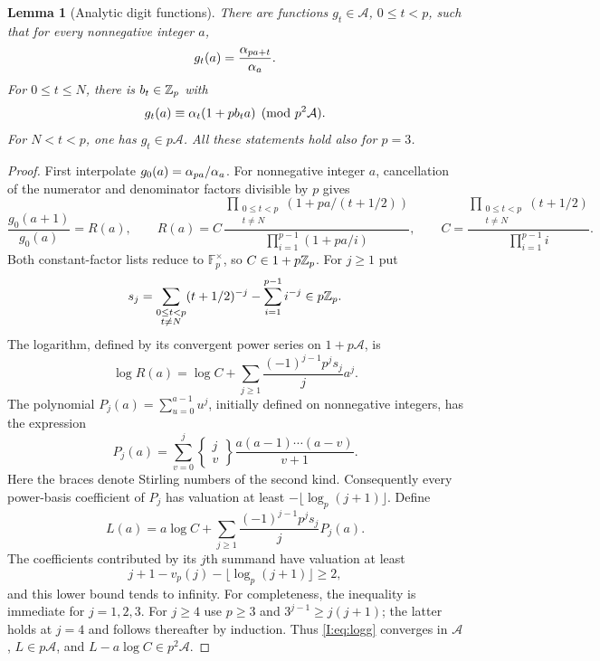 \documentclass[11pt,letterpaper]{article}
\newtheorem{lemma}[theorem]{Lemma}
\theoremstyle{definition}
\theoremstyle{remark}
\begin{document}
\begin{lemma}[Analytic digit functions]\label{I:lem:analyticdigits}
There are functions $g_t\in\mathcal A$, $0\le t<p$, such that for
every nonnegative integer $a$,
\begin{equation}\label{I:eq:exactdigits}
 g_t(a)=\frac{\alpha_{pa+t}}{\alpha_a}.
\end{equation}
For $0\le t\le N$, there is $b_t\in\mathbb Z_p$ with
\begin{equation}\label{I:eq:affinegt}
 g_t(a)\equiv\alpha_t(1+pb_ta)\pmod{p^2\mathcal A}.
\end{equation}
For $N<t<p$, one has $g_t\in p\mathcal A$.
All these statements hold also for $p=3$.
\end{lemma}
\begin{proof}
First interpolate $g_0(a)=\alpha_{pa}/\alpha_a$.
For nonnegative integer $a$, cancellation of the numerator and
denominator factors divisible by $p$ gives
\[
 \frac{g_0(a+1)}{g_0(a)}=R(a),\qquad
 R(a)=C\,
 \frac{\displaystyle\prod_{\substack{0\le t<p\\t\ne N}}
                 (1+pa/(t+1/2))}
      {\displaystyle\prod_{i=1}^{p-1}(1+pa/i)},
 \qquad
 C=\frac{\displaystyle\prod_{\substack{0\le t<p\\t\ne N}}(t+1/2)}
          {\displaystyle\prod_{i=1}^{p-1}i}.
\]
Both constant-factor lists reduce to $\mathbb F_p^\times$, so
$C\in1+p\mathbb Z_p$.  For $j\ge1$ put
\[
 s_j=\sum_{\substack{0\le t<p\\t\ne N}}(t+1/2)^{-j}
                  -\sum_{i=1}^{p-1}i^{-j}\in p\mathbb Z_p.
\]
The logarithm, defined by its convergent power series on $1+p\mathcal A$,
is
\begin{equation}\label{I:eq:logR}
 \log R(a)=\log C+
       \sum_{j\ge1}\frac{(-1)^{j-1}p^js_j}{j}a^j.
\end{equation}
The polynomial $P_j(a)=\sum_{u=0}^{a-1}u^j$, initially defined on
nonnegative integers, has the expression
\[
 P_j(a)=\sum_{v=0}^j
 \left\{\begin{matrix}j\\v\end{matrix}\right\}
 \frac{a(a-1)\cdots(a-v)}{v+1}.
\]
Here the braces denote Stirling numbers of the second kind.  Consequently
every power-basis coefficient of $P_j$ has valuation at least
$-\lfloor\log_p(j+1)\rfloor$.
Define
\begin{equation}\label{I:eq:logg}
 L(a)=a\log C+
       \sum_{j\ge1}\frac{(-1)^{j-1}p^js_j}{j}P_j(a).
\end{equation}
The coefficients contributed by its $j$th summand have valuation at
least
\begin{equation}\label{I:eq:coefficientbound}
 j+1-v_p(j)-\lfloor\log_p(j+1)\rfloor\ge2,
\end{equation}
and this lower bound tends to infinity.  For completeness, the inequality
is immediate for $j=1,2,3$.  For $j\ge4$ use
$p\ge3$ and $3^{j-1}\ge j(j+1)$; the latter holds at $j=4$ and follows
thereafter by induction.
Thus \eqref{I:eq:logg} converges in $\mathcal A$,
$L\in p\mathcal A$, and $L-a\log C\in p^2\mathcal A$.


\end{proof}
\end{document}
